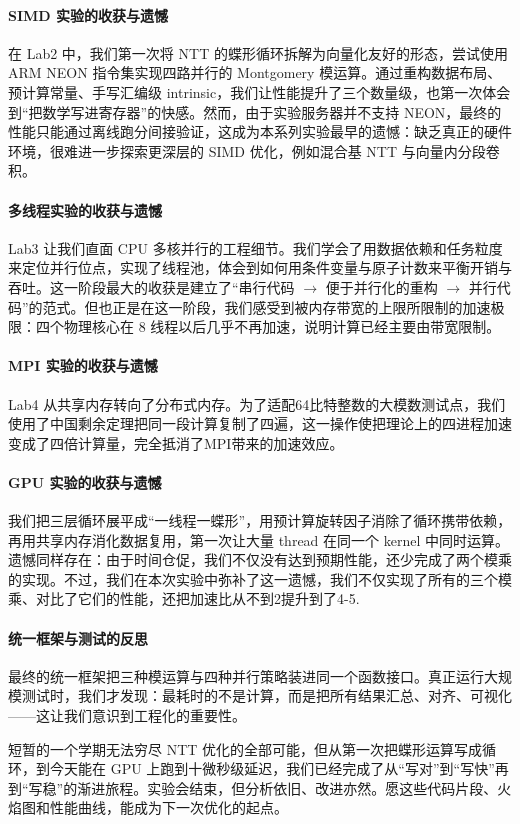 \documentclass[a4paper]{article}
\begin{document}
\paragraph{SIMD 实验的收获与遗憾} 在 Lab2 中，我们第一次将 NTT 的蝶形循环拆解为向量化友好的形态，尝试使用 ARM NEON 指令集实现四路并行的 Montgomery 模运算。通过重构数据布局、预计算常量、手写汇编级 intrinsic，我们让性能提升了三个数量级，也第一次体会到“把数学写进寄存器”的快感。然而，由于实验服务器并不支持 NEON，最终的性能只能通过离线跑分间接验证，这成为本系列实验最早的遗憾：缺乏真正的硬件环境，很难进一步探索更深层的 SIMD 优化，例如混合基 NTT 与向量内分段卷积。

\paragraph{多线程实验的收获与遗憾} Lab3 让我们直面 CPU 多核并行的工程细节。我们学会了用数据依赖和任务粒度来定位并行位点，实现了线程池，体会到如何用条件变量与原子计数来平衡开销与吞吐。这一阶段最大的收获是建立了“串行代码 $\rightarrow$ 便于并行化的重构 $\rightarrow$ 并行代码”的范式。但也正是在这一阶段，我们感受到被内存带宽的上限所限制的加速极限：四个物理核心在 8 线程以后几乎不再加速，说明计算已经主要由带宽限制。

\paragraph{MPI 实验的收获与遗憾} Lab4 从共享内存转向了分布式内存。为了适配64比特整数的大模数测试点，我们使用了中国剩余定理把同一段计算复制了四遍，这一操作使把理论上的四进程加速变成了四倍计算量，完全抵消了MPI带来的加速效应。

\paragraph{GPU 实验的收获与遗憾} 我们把三层循环展平成“一线程一蝶形”，用预计算旋转因子消除了循环携带依赖，再用共享内存消化数据复用，第一次让大量 thread 在同一个 kernel 中同时运算。遗憾同样存在：由于时间仓促，我们不仅没有达到预期性能，还少完成了两个模乘的实现。不过，我们在本次实验中弥补了这一遗憾，我们不仅实现了所有的三个模乘、对比了它们的性能，还把加速比从不到2提升到了4-5.

\paragraph{统一框架与测试的反思} 最终的统一框架把三种模运算与四种并行策略装进同一个函数接口。真正运行大规模测试时，我们才发现：最耗时的不是计算，而是把所有结果汇总、对齐、可视化——这让我们意识到工程化的重要性。

短暂的一个学期无法穷尽 NTT 优化的全部可能，但从第一次把蝶形运算写成循环，到今天能在 GPU 上跑到十微秒级延迟，我们已经完成了从“写对”到“写快”再到“写稳”的渐进旅程。实验会结束，但分析依旧、改进亦然。愿这些代码片段、火焰图和性能曲线，能成为下一次优化的起点。
\end{document}
